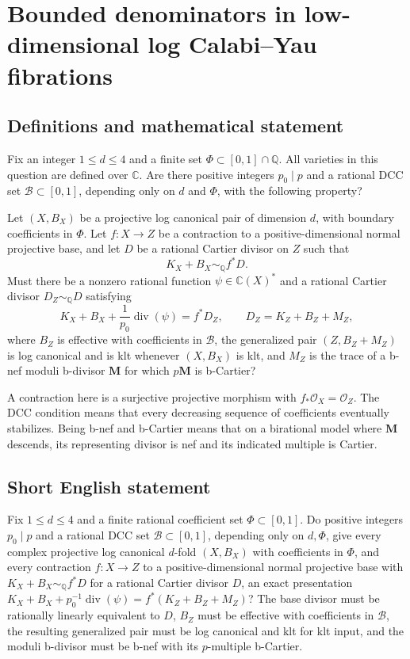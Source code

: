 \documentclass[11pt]{article}
\begin{document}
\section*{Bounded denominators in low-dimensional log Calabi–Yau fibrations}\label{statement}
\subsection{Definitions and mathematical statement}
Fix an integer \(1\le d\le4\) and a finite set \(\Phi\subset[0,1]\cap\mathbb Q\). All varieties in this question are defined over \(\mathbb C\). Are there positive integers \(p_0\mid p\) and a rational DCC set \(\mathcal B\subset[0,1]\), depending only on \(d\) and \(\Phi\), with the following property?

Let \((X,B_X)\) be a projective log canonical pair of dimension \(d\), with boundary coefficients in \(\Phi\). Let \(f:X\to Z\) be a contraction to a positive-dimensional normal projective base, and let \(D\) be a rational Cartier divisor on \(Z\) such that
\[
 K_X+B_X\sim_{\mathbb Q}f^*D.
\]
Must there be a nonzero rational function \(\psi\in\mathbb C(X)^*\) and a rational Cartier divisor \(D_Z\sim_{\mathbb Q}D\) satisfying
\[
 K_X+B_X+\frac1{p_0}\operatorname{div}(\psi)=f^*D_Z,
 \qquad D_Z=K_Z+B_Z+M_Z,
\]
where \(B_Z\) is effective with coefficients in \(\mathcal B\), the generalized pair \((Z,B_Z+M_Z)\) is log canonical and is klt whenever \((X,B_X)\) is klt, and \(M_Z\) is the trace of a b-nef moduli b-divisor \(\mathbf M\) for which \(p\mathbf M\) is b-Cartier?

A contraction here is a surjective projective morphism with \(f_*\mathcal O_X=\mathcal O_Z\). The DCC condition means that every decreasing sequence of coefficients eventually stabilizes. Being b-nef and b-Cartier means that on a birational model where \(\mathbf M\) descends, its representing divisor is nef and its indicated multiple is Cartier.
\subsection{Short English statement}
Fix \(1\le d\le4\) and a finite rational coefficient set \(\Phi\subset[0,1]\). Do positive integers \(p_0\mid p\) and a rational DCC set \(\mathcal B\subset[0,1]\), depending only on \(d,\Phi\), give every complex projective log canonical \(d\)-fold \((X,B_X)\) with coefficients in \(\Phi\), and every contraction \(f:X\to Z\) to a positive-dimensional normal projective base with \(K_X+B_X\sim_{\mathbb Q}f^*D\) for a rational Cartier divisor \(D\), an exact presentation \(K_X+B_X+p_0^{-1}\operatorname{div}(\psi)=f^*(K_Z+B_Z+M_Z)\)? The base divisor must be rationally linearly equivalent to \(D\), \(B_Z\) must be effective with coefficients in \(\mathcal B\), the resulting generalized pair must be log canonical and klt for klt input, and the moduli b-divisor must be b-nef with its \(p\)-multiple b-Cartier.
\end{document}
